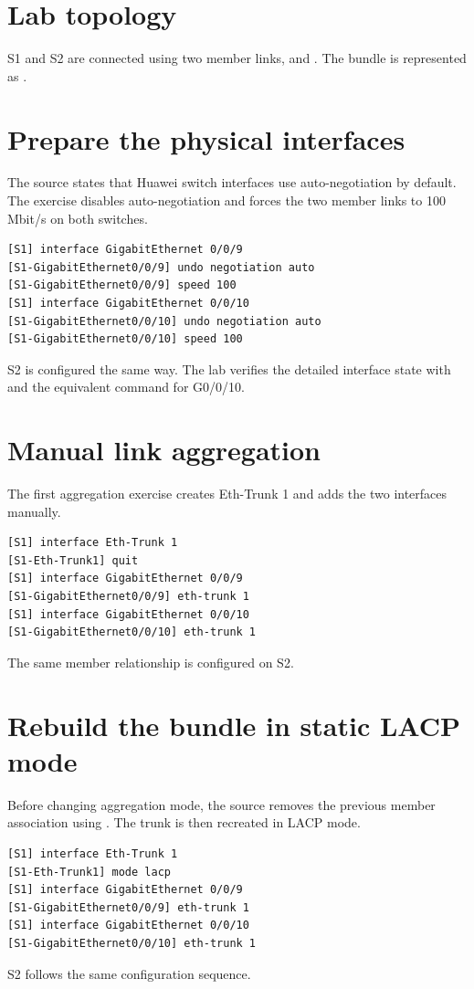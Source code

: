 \section{Lab topology}
S1 and S2 are connected using two member links,  and . The bundle is represented as .


\section{Prepare the physical interfaces}
The source states that Huawei switch interfaces use auto-negotiation by default. The exercise disables auto-negotiation and forces the two member links to 100 Mbit/s on both switches.
\begin{lstlisting}[style=dcnterminal]
[S1] interface GigabitEthernet 0/0/9
[S1-GigabitEthernet0/0/9] undo negotiation auto
[S1-GigabitEthernet0/0/9] speed 100
[S1] interface GigabitEthernet 0/0/10
[S1-GigabitEthernet0/0/10] undo negotiation auto
[S1-GigabitEthernet0/0/10] speed 100
\end{lstlisting}
S2 is configured the same way. The lab verifies the detailed interface state with  and the equivalent command for G0/0/10.

\section{Manual link aggregation}
The first aggregation exercise creates Eth-Trunk 1 and adds the two interfaces manually.
\begin{lstlisting}[style=dcnterminal]
[S1] interface Eth-Trunk 1
[S1-Eth-Trunk1] quit
[S1] interface GigabitEthernet 0/0/9
[S1-GigabitEthernet0/0/9] eth-trunk 1
[S1] interface GigabitEthernet 0/0/10
[S1-GigabitEthernet0/0/10] eth-trunk 1
\end{lstlisting}
The same member relationship is configured on S2.

\section{Rebuild the bundle in static LACP mode}
Before changing aggregation mode, the source removes the previous member association using . The trunk is then recreated in LACP mode.
\begin{lstlisting}[style=dcnterminal]
[S1] interface Eth-Trunk 1
[S1-Eth-Trunk1] mode lacp
[S1] interface GigabitEthernet 0/0/9
[S1-GigabitEthernet0/0/9] eth-trunk 1
[S1] interface GigabitEthernet 0/0/10
[S1-GigabitEthernet0/0/10] eth-trunk 1
\end{lstlisting}
S2 follows the same configuration sequence.

